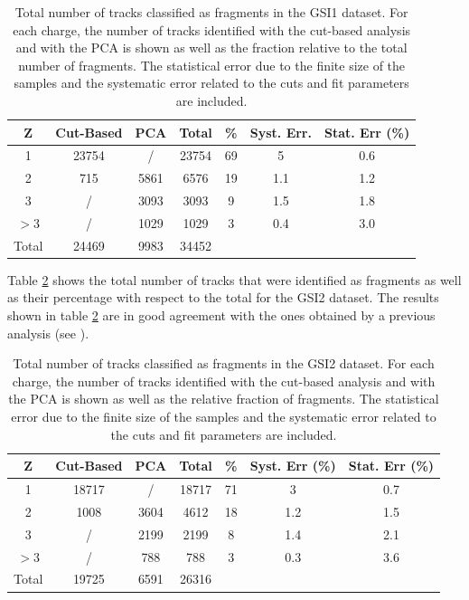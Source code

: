 \documentclass[utf8]{frontiersFPHY} %
\begin{document}
\begin{table}[h!]
    \centering
    \begin{tabular}{c|c|c|c|c|c|c}
        \textbf{Z} &  \textbf{Cut-Based} & \textbf{PCA} & \textbf{Total} & \textbf{\%} & \textbf{Syst. Err.} & \textbf{Stat. Err} (\%)\\
        \hline 
         1 & 23754 & / & 23754 & 69 & 5 & 0.6 \\
          2 & 715 & 5861 & 6576 & 19 & 1.1 & 1.2 \\
           3 & / & 3093 & 3093 & 9 & 1.5 & 1.8 \\
            $>3$ & /  & 1029 & 1029 & 3 & 0.4 & 3.0 \\
            \hline
            Total & 24469 & 9983 & 34452 \\
            \hline
    \end{tabular}
    \caption{Total number of tracks classified as fragments in the GSI1 dataset. For each charge, the number of tracks identified with the cut-based analysis and with the PCA is shown as well as the fraction relative to the total number of fragments. The statistical error due to the finite size of the samples and the systematic error related to the cuts and fit parameters are included. }
    \label{GSI1_tab}
\end{table}

Table \ref{GSI2_tab} shows the total number of tracks that were identified as fragments as well as their percentage with respect to the total for the GSI2 dataset. The results shown in table \ref{GSI2_tab} are in good agreement with the ones obtained by a previous analysis (see \cite{Galati2021}).
\begin{table}[h!]
    \centering
    \begin{tabular}{c|c|c|c|c|c|c}
        \textbf{Z} &  \textbf{Cut-Based} & \textbf{PCA} & \textbf{Total} & \textbf{\%} & \textbf{Syst. Err} (\%) & \textbf{Stat. Err} (\%)\\
        \hline 
         1 & 18717 & / & 18717 & 71 & 3 & 0.7 \\
          2 & 1008 & 3604 & 4612 & 18 & 1.2 & 1.5 \\
           3 & / & 2199 & 2199 & 8 & 1.4 & 2.1 \\
            $>3$ & /  & 788 & 788 & 3 & 0.3 & 3.6 \\
            \hline
            Total & 19725 & 6591 & 26316 \\
            \hline
    \end{tabular}
    \caption{Total number of tracks classified as fragments in the GSI2 dataset. For each charge, the number of tracks identified with the cut-based analysis and with the PCA is shown as well as the relative fraction of fragments. The statistical error due to the finite size of the samples and the systematic error related to the cuts and fit parameters are included. }
    \label{GSI2_tab}
\end{table}
\end{document}
